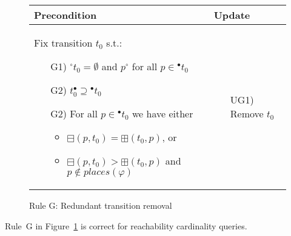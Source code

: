 \begin{figure}[h!]
    \vspace{4mm}

    \begin{adjustbox}{center}
        \begin{tabular}{|p{76mm}|p{40mm}|} \hline
        Precondition & Update \\ \hline
        Fix transition $t_0$ s.t.:
        \begin{itemize}[leftmargin=10mm]
            \item[G1)] ${}^\circ t_0=\emptyset$ and $p^\circ$ for all $p\in{}^\bullet t_0$
            \item[G2)] $t_0^\bullet\supseteq{}^\bullet t_0$
            \item[G2)] For all $p\in{}^\bullet t_0$ we have either
            \begin{itemize}[leftmargin=3mm]
                \item $\boxminus(p, t_0)=\boxplus(t_0, p)$, or
                \item $\boxminus(p, t_0)>\boxplus(t_0, p)$ and $p\notin places(\varphi)$
            \end{itemize}
        \end{itemize}
        &
        \begin{itemize}[leftmargin=10mm]
            \item[UG1)] Remove $t_0$
        \end{itemize} \\ \hline
        \end{tabular}
    \end{adjustbox}
    \caption{Rule G: Redundant transition removal}
    \label{fig:rule_g}
\end{figure}

\begin{theorem}\label{theorem:rule_g}
    Rule~G in Figure~\ref{fig:rule_g} is correct for reachability cardinality queries.
\end{theorem}
